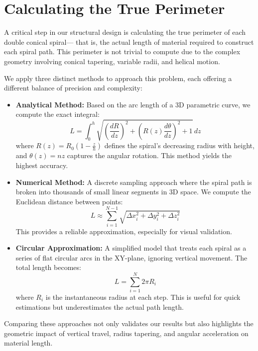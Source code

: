 \documentclass{article}%
\begin{document}
%
\vspace{1cm}

%
\newpage%
\section{Calculating the True Perimeter}%
\label{sec:CalculatingtheTruePerimeter}%
\begin{storybox}%
A critical step in our structural design is calculating the true perimeter of each double conical spiral—
            that is, the actual length of material required to construct each spiral path. This perimeter is not trivial
            to compute due to the complex geometry involving conical tapering, variable radii, and helical motion.

            We apply three distinct methods to approach this problem, each offering a different balance of precision and complexity:

            \begin{itemize}
                \item \textbf{Analytical Method:} Based on the arc length of a 3D parametric curve, we compute the exact integral:
                \[
                    L = \int_0^h \sqrt{\left(\frac{dR}{dz}\right)^2 + \left(R(z) \frac{d\theta}{dz}\right)^2 + 1} \, dz
                \]
                where \( R(z) = R_0 \left(1 - \frac{z}{h} \right) \) defines the spiral's decreasing radius with height, and 
                \( \theta(z) = n z \) captures the angular rotation. This method yields the highest accuracy.

                \item \textbf{Numerical Method:} A discrete sampling approach where the spiral path is broken into thousands of small
                linear segments in 3D space. We compute the Euclidean distance between points:
                \[
                    L \approx \sum_{i=1}^{N-1} \sqrt{ \Delta x_i^2 + \Delta y_i^2 + \Delta z_i^2 }
                \]
                This provides a reliable approximation, especially for visual validation.

                \item \textbf{Circular Approximation:} A simplified model that treats each spiral as a series of flat circular arcs in the XY-plane, 
                ignoring vertical movement. The total length becomes:
                \[
                    L = \sum_{i=1}^{N} 2\pi R_i
                \]
                where \( R_i \) is the instantaneous radius at each step. This is useful for quick estimations but underestimates the actual path length.
            \end{itemize}

            Comparing these approaches not only validates our results but also highlights the geometric impact of vertical travel,
            radius tapering, and angular acceleration on material length.%
\end{storybox}%
\vspace{1cm}%
\end{document}
